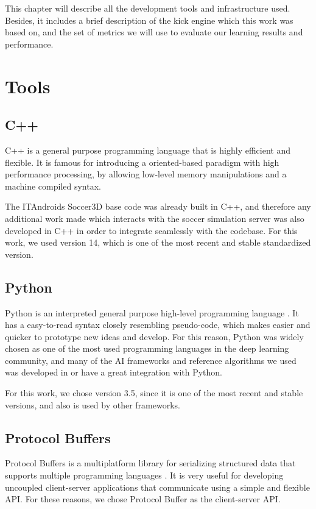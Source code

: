 
This chapter will describe all the development tools and infrastructure used. Besides, it includes a brief description of the kick engine which this work was based on, and the set of metrics we will use to evaluate our learning results and performance.

\section{Tools}

\subsection{C++}

C++ is a general purpose programming language that is highly efficient and flexible. It is famous for introducing a oriented-based paradigm with high performance processing, by allowing low-level memory manipulations and a machine compiled syntax. \cite{C++}

The ITAndroids Soccer3D base code was already built in C++, and therefore any additional work made which interacts with the soccer simulation server was also developed in C++ in order to integrate seamlessly with the codebase. For this work, we used version 14, which is one of the most recent and stable standardized version.

\subsection{Python}

Python is an interpreted general purpose high-level programming language \cite{Python}. It has a easy-to-read syntax closely resembling pseudo-code, which makes easier and quicker to prototype new ideas and develop. For this reason, Python was widely chosen as one of the most used programming languages in the deep learning community, and many of the AI frameworks and reference algorithms we used was developed in or have a great integration with Python.

For this work, we chose version 3.5, since it is one of the most recent and stable versions, and also is used by other frameworks.

\subsection{Protocol Buffers}

Protocol Buffers is a multiplatform library for serializing structured data that supports multiple programming languages \cite{ProtoBuf}. It is very useful for developing uncoupled client-server applications that communicate using a simple and flexible API. For these reasons, we chose Protocol Buffer as the client-server API.

